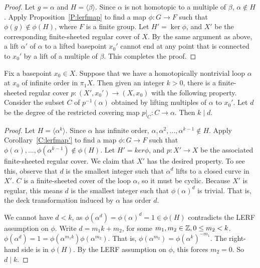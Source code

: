 \begin{proof}

Let $g = \alpha$ and $H = \langle\beta\rangle$. Since $\alpha$ is not homotopic
to a multiple of $\beta$, $\alpha \notin H$. Apply Proposition~\ref{P:lerfmap}
to find a map $\phi \colon G \to F$ such that $\phi(g) \notin \phi(H)$, where
$F$ is a finite group.  Let $H' = \operatorname{ker} \phi$, and $X'$ be the
corresponding finite-sheeted regular cover of $X$. By the same argument as
above, a lift $\alpha'$ of $\alpha$ to a lifted basepoint $x_0'$ cannot end at
any point that is connected to $x_0'$ by a lift of a multiple of $\beta$. This
completes the proof.

\end{proof}

\begin{prop}\label{P:lerf3}

Fix a basepoint $x_0 \in X$.  Suppose that we have a homotopically nontrivial
loop $\alpha$ at $x_0$ of infinite order in $\pi_1X$.  Then given an integer
$k>0$, there is a finite-sheeted regular cover $p \colon (X',x_0') \to (X,x_0)$
with the following property.  Consider the subset $C$ of $p^{-1}(\alpha)$
obtained by lifting multiples of $\alpha$ to $x_0'$. Let $d$ be the degree of
the restricted covering map $p|_C \colon C \to \alpha$. Then $k \mid d$.

\end{prop}

\begin{proof}

Let $H = \langle\alpha^k\rangle$. Since $\alpha$ has infinite order,
$\alpha,\alpha^2,\dots,\alpha^{k-1} \notin H$. Apply Corollary~\ref{C:lerfmap'}
to find a map $\phi \colon G \to F$ such that
$\phi(\alpha),\dots,\phi(\alpha^{k-1}) \notin \phi(H)$. Let $H' = ker \phi$,
and $p \colon X' \to X$ be the associated finite-sheeted regular cover.  We
claim that $X'$ has the desired property. To see this, observe that $d$ is the
smallest integer such that $\alpha^d$ lifts to a closed curve in $X'$. $C$ is
a finite-sheeted cover of the loop $\alpha$, so it must be cyclic. Because $X'$
is regular, this means $d$ is the smallest integer such that $\phi(\alpha)^d$
is trivial. That is, the deck transformation induced by $\alpha$ has order $d$.

We cannot have $d<k$, as $\phi(\alpha^d)=\phi(\alpha)^d=1 \in \phi(H)$
contradicts the LERF assumption on $\phi$. Write $d = m_1k + m_2$, for some
$m_1,m_2 \in \mathbb{Z}, 0 \leq m_2 < k$.
$\phi(\alpha^d)=1=\phi(\alpha^{m_1k})\phi(\alpha^{m_2})$.  That is,
$\phi(\alpha^{m_2})=\phi(\alpha^k)^{-m_1}$. The right-hand side is in
$\phi(H)$.  By the LERF assumption on $\phi$, this forces $m_2=0$. So $d \mid
k$.

\end{proof}

